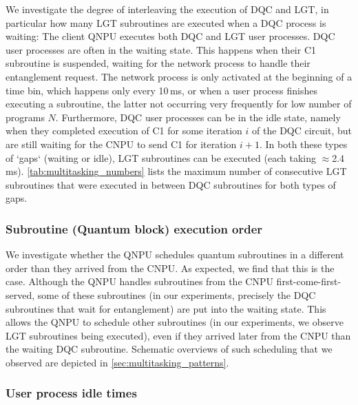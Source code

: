 We investigate the degree of interleaving the execution of \ac{DQC} and \ac{LGT}, in particular how many \ac{LGT} subroutines are executed when a \ac{DQC} process is waiting: The client \ac{QNPU} executes both \ac{DQC} and \ac{LGT} user processes. \ac{DQC} user processes are often in the waiting state. This happens when their C1 subroutine is suspended, waiting for the network process to handle their entanglement request. The network process is only activated at the beginning of a time bin, which happens only every 10\,ms, or when a user process finishes executing a subroutine, the latter not occurring very frequently for low number of programs $N$. Furthermore, \ac{DQC} user processes can be in the idle state, namely when they completed execution of C1 for some iteration $i$ of the \ac{DQC} circuit, but are still waiting for the \ac{CNPU} to send C1 for iteration $i+1$. In both these types of `gaps` (waiting or idle), \ac{LGT} subroutines can be executed (each taking $\approx$2.4\,ms). \cref{tab:multitasking_numbers} lists the maximum number of consecutive \ac{LGT} subroutines that were executed in between \ac{DQC} subroutines  for both types of gaps. 

\subsubsection{Subroutine (Quantum block) execution order}

We investigate whether the \ac{QNPU} schedules quantum subroutines in a different order than they arrived from the \ac{CNPU}. As expected, we find that this is the case. Although the \ac{QNPU} handles subroutines from the \ac{CNPU} first-come-first-served, some of these subroutines (in our experiments, precisely the \ac{DQC} subroutines that wait for entanglement) are put into the waiting state. This allows the \ac{QNPU} to schedule other subroutines (in our experiments, we observe \ac{LGT} subroutines being executed), even if they arrived later from the \ac{CNPU} than the waiting \ac{DQC} subroutine. Schematic overviews of such scheduling that we observed are depicted in \cref{sec:multitasking_patterns}.

\subsubsection{User process idle times}

